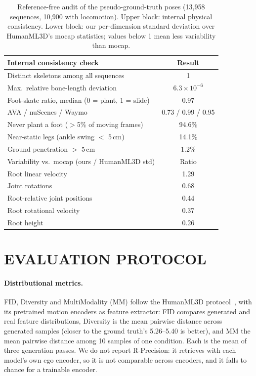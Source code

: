 \documentclass{ieeeoj}
\begin{document}
\begin{table}[t]
  \centering
  \caption{Reference-free audit of the pseudo-ground-truth poses (13{,}958 sequences, 10{,}900 with locomotion). Upper block: internal physical consistency. Lower block: our per-dimension standard deviation over HumanML3D's mocap statistics; values below 1 mean less variability than mocap.}
  \label{tab:posequality}
  \vspace{4pt}
  \footnotesize
  \begin{tabular}{lc}
    \toprule
    Internal consistency check & Result \\
    \midrule
    Distinct skeletons among all sequences & 1 \\
    Max.\ relative bone-length deviation & $6.3\times10^{-6}$ \\
    Foot-skate ratio, median (0 = plant, 1 = slide) & 0.97 \\
    \quad AVA / nuScenes / Waymo & 0.73 / 0.99 / 0.95 \\
    Never plant a foot ($>$5\% of moving frames) & 94.6\% \\
    Near-static legs (ankle swing $<$ 5\,cm) & 14.1\% \\
    Ground penetration $>$ 5\,cm & 1.2\% \\
    \midrule
    Variability vs.\ mocap (ours / HumanML3D std) & Ratio \\
    \midrule
    Root linear velocity & 1.29 \\
    Joint rotations & 0.68 \\
    Root-relative joint positions & 0.44 \\
    Root rotational velocity & 0.37 \\
    Root height & 0.26 \\
    \bottomrule
  \end{tabular}
\end{table}

\section{EVALUATION PROTOCOL}
\label{sec:eval}

\paragraph{Distributional metrics.}
FID, Diversity and MultiModality (MM) follow the HumanML3D protocol~\cite{guo2022humanml3d}, with its pretrained motion encoders as feature extractor: FID compares generated and real feature distributions, Diversity is the mean pairwise distance across generated samples (closer to the ground truth's 5.26--5.40 is better), and MM the mean pairwise distance among 10 samples of one condition. Each is the mean of three generation passes. We do not report R-Precision: it retrieves with each model's own ego encoder, so it is not comparable across encoders, and it falls to chance for a trainable encoder.
\end{document}
